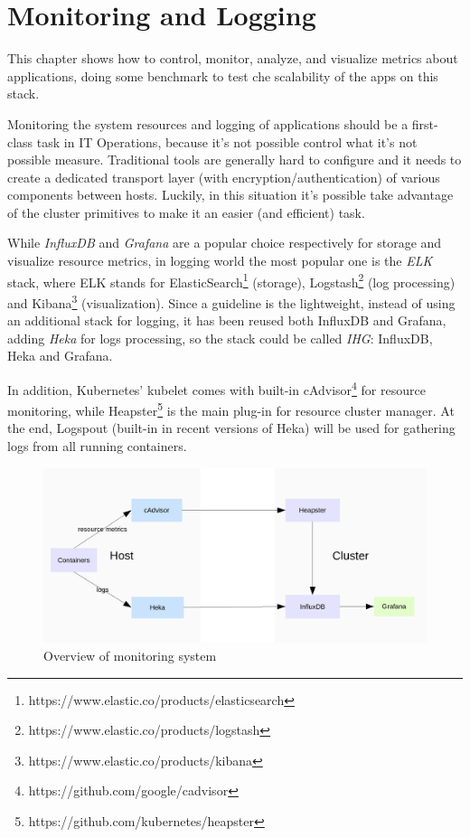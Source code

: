 \chapter{Monitoring and Logging}\label{monitoring-and-logging}

This chapter shows how to control, monitor, analyze, and visualize
metrics about applications, doing some benchmark to test che scalability
of the apps on this stack.

Monitoring the system resources and logging of applications should be a
first-class task in IT Operations, because it's not possible control
what it's not possible measure. Traditional tools are generally hard to
configure and it needs to create a dedicated transport layer (with
encryption/authentication) of various components between hosts. Luckily,
in this situation it's possible take advantage of the cluster primitives
to make it an easier (and efficient) task.

While \textit{InfluxDB} and \textit{Grafana} are a popular choice
respectively for storage and visualize resource metrics, in logging
world the most popular one is the \textit{ELK} stack, where ELK stands for
ElasticSearch\footnote{https://www.elastic.co/products/elasticsearch} (storage), Logstash\footnote{https://www.elastic.co/products/logstash} (log processing) and
Kibana\footnote{https://www.elastic.co/products/kibana} (visualization). Since a guideline is the lightweight,
instead of using an additional stack for logging, it has been reused
both InfluxDB and Grafana, adding \textit{Heka} for logs processing, so
the stack could be called \textit{IHG}: InfluxDB, Heka and Grafana.

In addition, Kubernetes' kubelet comes with built-in cAdvisor\footnote{https://github.com/google/cadvisor} for
resource monitoring, while Heapster\footnote{https://github.com/kubernetes/heapster} is the main plug-in for
resource cluster manager. At the end, Logspout (built-in in recent
versions of Heka) will be used for gathering logs from all running
containers.

\begin{figure}[htbp]
\centering
\includegraphics{media/ch6-overview.png}
\caption{Overview of monitoring system}
\end{figure}


